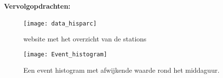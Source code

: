 \begin{questions}
\paragraph{Vervolgopdrachten: }

\begin{figure} 
    \centering
    \texttt{[image: data\_hisparc]} 
    \caption{website met het overzicht van de stations} 
    \label{fig:data_hisparc} 
\end{figure}

\begin{figure} 
    \centering
    \texttt{[image: Event\_histogram]} \caption{Een
    event histogram met afwijkende waarde rond het middaguur.}
    \label{fig:Event_histogram} 
\end{figure}


\end{questions} 
